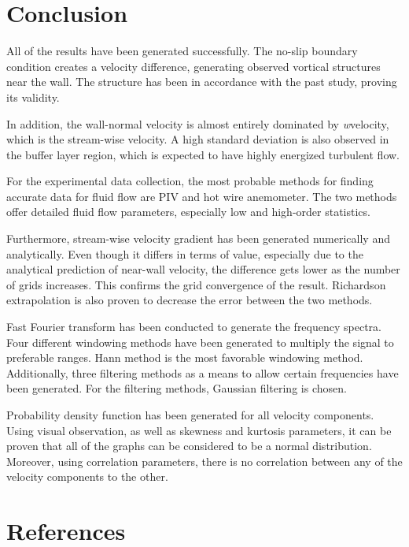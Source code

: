 \documentclass[11pt]{article}
\begin{document}
\section{Conclusion}
All of the results have been generated successfully. The no-slip boundary condition creates a velocity difference, generating observed vortical structures near the wall. The structure has been in accordance with the past study, proving its validity.\par
\medskip
\noindent In addition, the wall-normal velocity is almost entirely dominated by \textit{w}velocity, which is the stream-wise velocity. A high standard deviation is also observed in the buffer layer region, which is expected to have highly energized turbulent flow. \par
\medskip
\noindent For the experimental data collection, the most probable methods for finding accurate data for fluid flow are PIV and hot wire anemometer. The two methods offer detailed fluid flow parameters, especially low and high-order statistics.\par
\medskip
\noindent Furthermore, stream-wise velocity gradient has been generated numerically and analytically. Even though it differs in terms of value, especially due to the analytical prediction of near-wall velocity, the difference gets lower as the number of grids increases. This confirms the grid convergence of the result. Richardson extrapolation is also proven to decrease the error between the two methods. \par
\medskip
\noindent Fast Fourier transform has been conducted to generate the frequency spectra. Four different windowing methods have been generated to multiply the signal to preferable ranges. Hann method is the most favorable windowing method. Additionally, three filtering methods as a means to allow certain frequencies have been generated. For the filtering methods, Gaussian filtering is chosen. \par
\medskip
\noindent Probability density function has been generated for all velocity components. Using visual observation, as well as skewness and kurtosis parameters, it can be proven that all of the graphs can be considered to be a normal distribution. Moreover, using correlation parameters, there is no correlation between any of the velocity components to the other.
\section{References}
{}
\end{document}
